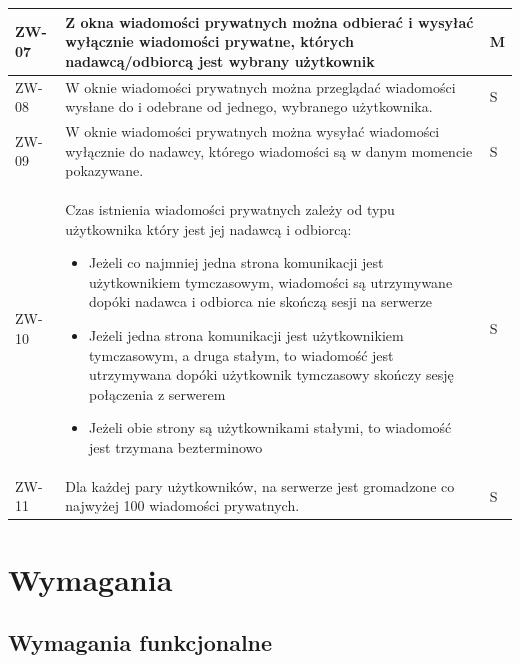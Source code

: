 \documentclass[11pt,oneside,a4paper,titlepage,onecolumn]{article}
\begin{document}
\begin{tabular}{ | l | l | l | }
    \hline
    ZW-07 & \parbox[t]{14cm}{
      Z okna wiadomości prywatnych można odbierać i wysyłać wyłącznie
      wiadomości prywatne, których nadawcą/odbiorcą jest wybrany
      użytkownik
    } & M \\    
    
    \hline
    ZW-08 & \parbox[t]{14cm}{
      W oknie wiadomości prywatnych można przeglądać wiadomości wysłane do i odebrane od jednego, wybranego użytkownika.
      
    } & S \\
    
    \hline
    ZW-09 & \parbox[t]{14cm}{
      W oknie wiadomości prywatnych można wysyłać wiadomości
      wyłącznie do nadawcy, którego wiadomości są w danym momencie
      pokazywane.
    } & S \\
    
    \hline
    ZW-10 & \parbox[t]{14cm}{
      Czas istnienia wiadomości prywatnych zależy od typu użytkownika
      który jest jej nadawcą i odbiorcą:
      \begin{itemize}
      	\item Jeżeli co najmniej jedna strona komunikacji
      	 jest użytkownikiem tymczasowym, wiadomości są
      	 utrzymywane dopóki nadawca i odbiorca nie skończą
      	 sesji na serwerze
      	\item Jeżeli jedna strona komunikacji jest
      	użytkownikiem
      	tymczasowym, a druga stałym, to wiadomość jest utrzymywana
      	dopóki użytkownik tymczasowy skończy sesję połączenia z
      	serwerem
      	\item Jeżeli obie strony są użytkownikami stałymi, to
      	wiadomość jest trzymana bezterminowo
      \end{itemize}
    } & S \\
    
    \hline
    ZW-11 & \parbox[t]{14cm}{
      Dla każdej pary użytkowników, na serwerze jest
      gromadzone co najwyżej 100 wiadomości prywatnych.
    } & S \\
    \hline
  \end{tabular}

\section{Wymagania}

\subsection{Wymagania funkcjonalne}
\end{document}
